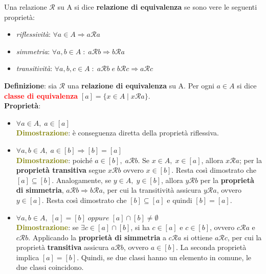 Una relazione $\mathcal{R}$ su A si dice \textbf{relazione di equivalenza} se sono vere le seguenti proprietà:
\begin{itemize}[nosep]
    \item \textit{riflessività}: $\forall a \in A \Rightarrow a\mathcal{R}a$
    \item \textit{simmetria}: $\forall a,b \in A \; : \; a\mathcal{R}b \Rightarrow b\mathcal{R}a$
    \item \textit{transitività}: $\forall a,b,c \in A \; : \; a\mathcal{R}b \; e \; b\mathcal{R}c \Rightarrow a\mathcal{R}c$
\end{itemize}
\textbf{Definizione}: sia $\mathcal{R}$ una \textbf{relazione di equivalenza} su A. Per ogni $a \in A$ si dice \textcolor{red}{\textbf{classe di equivalenza}} $[a] = \{x \in A \; | \; x\mathcal{R}a\}$. \\ \newline
\textbf{Proprietà}:
\begin{itemize}[nosep]
    \item $\forall a \in A, \; a \in [a]$ \\
          \textcolor{olive}{\textbf{Dimostrazione}}: è conseguenza diretta della proprietà riflessiva.
    \item $\forall a,b \in A, \; a \in [b] \Rightarrow [b] = [a]$ \\
          \textcolor{olive}{\textbf{Dimostrazione}}: poiché $a \in [b], \; a\mathcal{R}b$. Se $x \in A, \; x \in [a]$, allora $x\mathcal{R}a$; per la \textbf{proprietà transitiva} segue $x\mathcal{R}b$ ovvero $x \in [b]$. Resta così dimostrato che $[a] \subseteq [b]$. Analogamente, se $y \in A, \; y \in [b]$, allora $y\mathcal{R}b$ per la \textbf{proprietà di simmetria}, $a\mathcal{R}b \Rightarrow b\mathcal{R}a$, per cui la transitività assicura $y\mathcal{R}a$, ovvero $y \in [a]$. Resta così dimostrato che $[b] \subseteq [a]$ e quindi $[b] = [a]$.
    \item $\forall a,b \in A, \; [a] = [b] \; oppure \; [a] \cap [b] \neq \emptyset$ \\
          \textcolor{olive}{\textbf{Dimostrazione}}: se $\exists c \in [a] \cap [b]$, si ha $c \in [a]$ e $c \in [b]$, ovvero $c\mathcal{R}a$ e $c\mathcal{R}b$. Applicando la \textbf{proprietà di simmetria} a $c\mathcal{R}a$ si ottiene $a\mathcal{R}c$, per cui la proprietà \textbf{transitiva} assicura $a\mathcal{R}b$, ovvero $a \in [b]$. La seconda proprietà implica $[a] = [b]$. Quindi, se due classi hanno un elemento in comune, le due classi coincidono.
\end{itemize}
